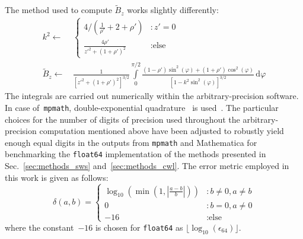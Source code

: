 The method used to compute $\tilde{B}_z$ works slightly differently:
\begin{align}
 k^2 \leftarrow&\,
  \begin{cases}
    4 / \left( \frac{1}{\rho'} + 2 + \rho' \right)    &: z' = 0 \\
    \frac{4 \rho'}{{z'}^2 + \left(1 + \rho'\right)^2} &: \textrm{else}
  \end{cases} \nonumber \\
 \tilde{B}_z \leftarrow&\,
   \frac{1}{\left[ {z'}^2 + \left(1 + \rho'\right)^2 \right]^{3/2} }
                                 \int\limits_0^{\pi/2}
                                   \frac{(1-\rho') \sin^2(\varphi) + (1+\rho') \cos^2(\varphi)}
                                        {\left[1 - k^2 \sin^2(\varphi) \right]^{3/2}} \,\mathrm{d}\varphi  \label{eqn:B_z_ref}
\end{align}
The integrals are carried out numerically within the arbitrary-precision software.
In case of~\texttt{mpmath}, double-exponential quadrature~\cite{double_exp_quad} is used~\cite{mpmath_quad}.
The particular choices for the number of digits of precision used throughout the arbitrary-precision computation
mentioned above have been adjusted to robustly yield enough equal digits
in the outputs from \texttt{mpmath} and Mathematica for benchmarking the \texttt{float64} implementation of the methods presented in Sec.~\ref{sec:methods_sws} and~\ref{sec:methods_cwl}.
The error metric employed in this work is given as follows:
\begin{equation}
 \delta(a, b)
 = \begin{cases}
    \log_{10} \left(\min\left(1, \left| \frac{a - b}{b} \right|\right) \right) &: b \neq 0, a \neq b \\
    0                                                                          &: b=0, a \neq 0 \\
    -16                                                                        &: \textrm{else}
   \end{cases} \label{eqn:error_metric}
\end{equation}
where the constant~$-16$ is chosen for \texttt{float64} as $\lfloor \log_{10}(\epsilon_{64}) \rfloor$.


